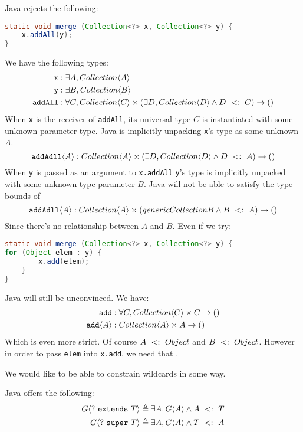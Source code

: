 \documentclass{article}
\begin{document}
\begin{example}
Java rejects the following:
\begin{lstlisting}[language=Java]
static void merge (Collection<?> x, Collection<?> y) {
    x.addAll(y);
}
\end{lstlisting}
We have the following types:
\begin{align*}
    \texttt{x} &: \exists A, Collection \langle A \rangle \\
    \texttt{y} &: \exists B, Collection \langle B \rangle \\
    \texttt{addAll} &: \forall C, Collection \langle C \rangle \times (\exists D, Collection \langle D \rangle \wedge D ~ <: ~ C) \rightarrow ()
\end{align*}
When \texttt{x} is the receiver of \texttt{addAll}, its universal type $C$ is instantiated with some unknown parameter type.
Java is implicitly unpacking \texttt{x}'s type as some unknown $A$.
$$ \texttt{addAdll} \langle A \rangle : Collection \langle A \rangle \times (\exists D, Collection \langle D \rangle \wedge D ~ <: ~ A) \rightarrow ()$$
When \texttt{y} is passed as an argument to \texttt{x.addAll} \texttt{y}'s type is implicitly unpacked with some unknown type parameter $B$.
Java will not be able to satisfy the type bounds of
$$ \texttt{addAdll} \langle A \rangle : Collection \langle A \rangle \times (generic{Collection}{B} \wedge B ~ <: ~ A) \rightarrow ()$$
Since there's no relationship between $A$ and $B$.
Even if we try:
\begin{lstlisting}[language=Java]
static void merge (Collection<?> x, Collection<?> y) {
for (Object elem : y) {
        x.add(elem);
    }
}
\end{lstlisting}
Java will still be unconvinced.
We have:
\begin{align*}
\texttt{add} &: \forall C, Collection \langle C \rangle \times C \rightarrow () \\
\texttt{add} \langle A \rangle &: Collection \langle A \rangle \times A \rightarrow ()
\end{align*}
Which is even more strict.
Of course $A ~ <: ~ Object$ and $B ~ <: ~ Object$.
However in order to pass \texttt{elem} into \texttt{x.add}, we need that \texttt{}.
\end{example}

We would like to be able to constrain wildcards in some way.

\begin{definition}
Java offers the following:
\begin{align*}
G \langle ? ~ \texttt{extends} ~ T \rangle &\triangleq \exists A, G \langle A \rangle \wedge A ~ <: ~ T \\
G \langle ? ~ \texttt{super} ~ T \rangle &\triangleq \exists A, G \langle A \rangle \wedge T ~ <: ~ A
\end{align*}
\end{definition}
\end{document}
